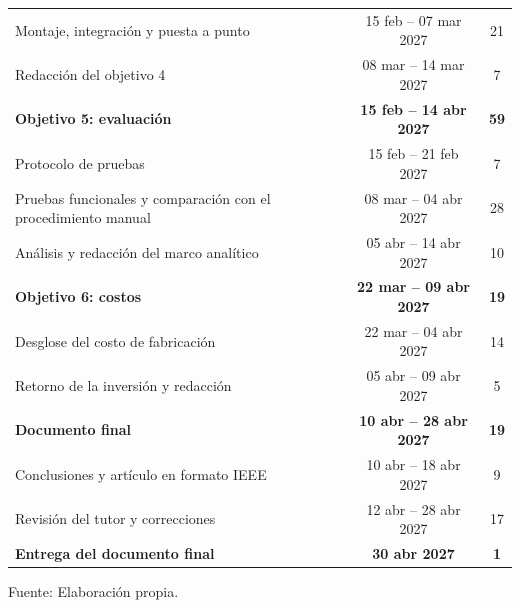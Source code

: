 \begin{table}[H]
\begin{tabular}{lcc}
        \hspace{1em}Montaje, integración y puesta a punto & 15 feb -- 07 mar 2027 & 21 \\
        \hspace{1em}Redacción del objetivo 4 & 08 mar -- 14 mar 2027 & 7 \\
        \rowcolor{lightgray!50}
        \textbf{Objetivo 5: evaluación} & \textbf{15 feb -- 14 abr 2027} & \textbf{59} \\
        \hspace{1em}Protocolo de pruebas & 15 feb -- 21 feb 2027 & 7 \\
        \hspace{1em}Pruebas funcionales y comparación con el procedimiento manual & 08 mar -- 04 abr 2027 & 28 \\
        \hspace{1em}Análisis y redacción del marco analítico & 05 abr -- 14 abr 2027 & 10 \\
        \rowcolor{lightgray!50}
        \textbf{Objetivo 6: costos} & \textbf{22 mar -- 09 abr 2027} & \textbf{19} \\
        \hspace{1em}Desglose del costo de fabricación & 22 mar -- 04 abr 2027 & 14 \\
        \hspace{1em}Retorno de la inversión y redacción & 05 abr -- 09 abr 2027 & 5 \\
        \rowcolor{lightgray!50}
        \textbf{Documento final} & \textbf{10 abr -- 28 abr 2027} & \textbf{19} \\
        \hspace{1em}Conclusiones y artículo en formato IEEE & 10 abr -- 18 abr 2027 & 9 \\
        \hspace{1em}Revisión del tutor y correcciones & 12 abr -- 28 abr 2027 & 17 \\
        \midrule
        \textbf{Entrega del documento final} & \textbf{30 abr 2027} & \textbf{1} \\
        \bottomrule[1pt]
    \end{tabular}

    \vspace{2pt}
    {\footnotesize Fuente: Elaboración propia.}
\end{table}
